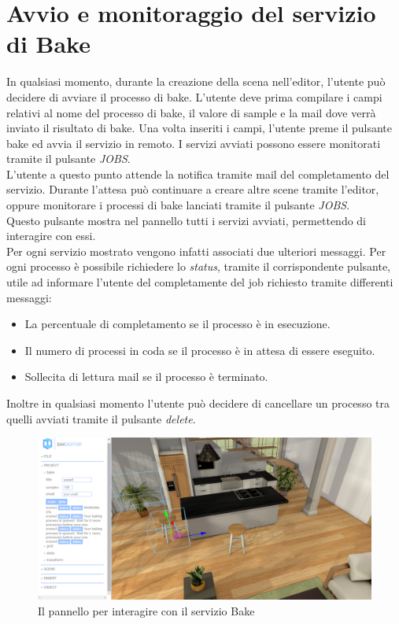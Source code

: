 \section{Avvio e monitoraggio del servizio di Bake}
\label{sec:chapter_caso_uso_section_2}

In qualsiasi momento, durante la creazione della scena nell’editor, l’utente può decidere di avviare il processo di bake.
L’utente deve prima compilare i campi relativi al nome del processo di bake, il valore di sample e la mail dove verrà inviato il risultato di bake.
Una volta inseriti i campi, l’utente preme il pulsante bake ed avvia il servizio in remoto.
I servizi avviati possono essere monitorati tramite il pulsante \emph{JOBS}.
\\
L’utente a questo punto attende la notifica tramite mail del completamento del servizio.
Durante l’attesa può continuare a creare altre scene tramite l’editor, oppure monitorare i processi di bake lanciati tramite il pulsante \emph{JOBS}.
\\
Questo pulsante mostra nel pannello tutti i servizi avviati, permettendo di interagire con essi. \\
Per ogni servizio mostrato vengono infatti associati due ulteriori messaggi.
Per ogni processo è possibile richiedere lo \emph{status}, tramite il corrispondente pulsante, utile ad informare l’utente del completamente del job richiesto tramite differenti messaggi:
\begin{itemize}
\item La percentuale di completamento se il processo è in esecuzione.
\item Il numero di processi in coda se il processo è in attesa di essere eseguito.
\item Sollecita di lettura mail se il processo è terminato.
\end{itemize}
Inoltre in qualsiasi momento l’utente può decidere di cancellare un processo tra quelli avviati tramite il pulsante \emph{delete}.
\\
\begin{figure}[htb]
 \centering
 \includegraphics[width=1\linewidth]{images/chapter_caso_uso/service_bake.png}\hfill
 \caption[Pannello di interazione con il servizio]{Il pannello per interagire con il servizio Bake}
 \label{fig:caso_uso_service_bake}
\end{figure}